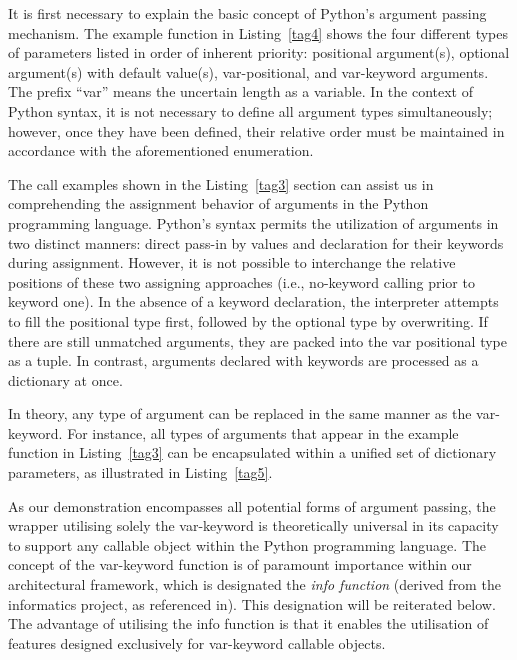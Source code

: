 \documentclass[a4paper,12pt]{article}
\newcommand{\mycite}[1]{{\color{black}\cite{#1}}}
\newcommand{\mycode}[1]{{\color{black}Listing~\ref{#1}}}
\begin{document}
It is first necessary to explain the basic concept of Python's argument passing mechanism. The example function in \mycode{tag4} shows the four different types of parameters listed in order of inherent priority: positional argument(s), optional argument(s) with default value(s), var-positional, and var-keyword arguments. The prefix ``var'' means the uncertain length as a variable. In the context of Python syntax, it is not necessary to define all argument types simultaneously; however, once they have been defined, their relative order must be maintained in accordance with the aforementioned enumeration.\par



The call examples shown in the \mycode{tag3} section can assist us in comprehending the assignment behavior of arguments in the Python programming language. Python's syntax permits the utilization of arguments in two distinct manners: direct pass-in by values and declaration for their keywords during assignment. However, it is not possible to interchange the relative positions of these two assigning approaches (i.e., no-keyword calling prior to keyword one). In the absence of a keyword declaration, the interpreter attempts to fill the positional type first, followed by the optional type by overwriting. If there are still unmatched arguments, they are packed into the var positional type as a tuple. In contrast, arguments declared with keywords are processed as a dictionary at once.\par

In theory, any type of argument can be replaced in the same manner as the var-keyword. For instance, all types of arguments that appear in the example function in \mycode{tag3} can be encapsulated within a unified set of dictionary parameters, as illustrated in \mycode{tag5}.\par



As our demonstration encompasses all potential forms of argument passing, the wrapper utilising solely the var-keyword is theoretically universal in its capacity to support any callable object within the Python programming language. The concept of the var-keyword function is of paramount importance within our architectural framework, which is designated the \emph{info function} (derived from the informatics project, as referenced in\mycite{informatics}). This designation will be reiterated below. The advantage of utilising the info function is that it enables the utilisation of features designed exclusively for var-keyword callable objects.\par
\end{document}
